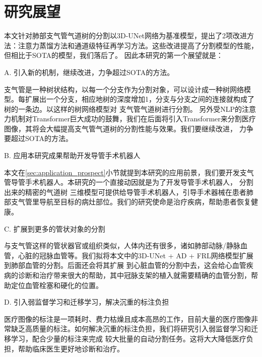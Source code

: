 \section{研究展望}

本文针对肺部支气管气道树的分割以3D-UNet网络为基准模型，提出了2项改进方法：注意力蒸馏方法和通道级特征再学习方法。这些改进提高了分割模型的性能，但相比于SOTA的模型，我们落后了。
因此本研究的第一个展望就是：

{\heiti A. 引入新的机制，继续改进，力争超过SOTA的方法。} 

支气管是一种树状结构，以每一个分支作为分割对象，可以设计成一种树网络模型。每扩展出一个分支，相应地树的深度增加1，分支与分支之间的连接就构成了树的一条边。以这样的树网络模型对
支气管气道树进行分割。 另外受NLP的注意力机制对Transformer巨大成功的鼓舞，我们在后面将引入Transformer来分割医疗图像，其将会大幅提高支气管气道树的分割性能与效果。我们要继续改进，
力争要超过SOTA的方法。

{\heiti B. 应用本研究成果帮助开发导管手术机器人}

本文在\ref{sec:application_prospect}小节就提到本研究的应用前景，我们要开发支气管导管手术机器人。本研究的一个直接动因就是为了开发导管手术机器人， 分割出来的精密的气道树
三维模型可提供给导管手术机器人，引导手术器械在患者肺部支气管里导航至目标的病灶部位。我们的研究使命是治疗疾病，帮助患者恢复健康。

{\heiti C. 扩展到更多的管状对象的分割}

与支气管这样的管状器官或组织类似，人体内还有很多，诸如肺部动脉/静脉血管，心脏的冠脉血管等。我们拟将本文中的3D-UNet + AD + FRL网络模型扩展到肺部血管的分割。后面还会将其扩展
到心脏血管的分割中去，这会给心血管疾病的诊断和治疗带来很大的帮助，其中冠脉支架的植入就需要精确的血管分割，帮助定位血管栓塞和硬化的位置。

{\heiti D. 引入弱监督学习和迁移学习，解决沉重的标注负担}

医疗图像的标注是一项耗时、费力枯燥且成本高昂的工作，目前大量的医疗图像非常缺乏高质量的标注。如何解决沉重的标注负担，我们将研究引入弱监督学习和迁移学习，配合少量的标注来完成
较大批量的自动分割任务。这将大大降低医疗负担，帮助临床医生更好地诊断和治疗。